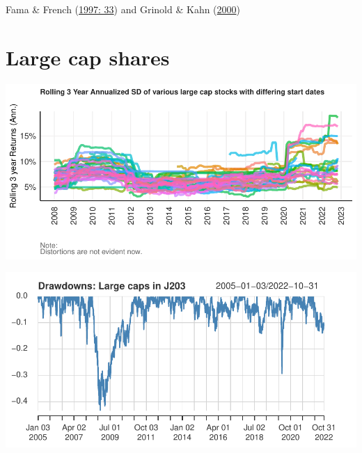\documentclass[11pt,preprint, authoryear]{elsarticle}
\let\origfigure\figure
\let\endorigfigure\endfigure
\renewenvironment{figure}[1][2] {
    \expandafter\origfigure\expandafter[H]
} {
    \endorigfigure
}
\numberwithin{equation}{section}
\numberwithin{figure}{section}
\numberwithin{table}{section}
\begin{document}
Fama \& French (\protect\hyperlink{ref-fama1997}{1997: 33}) and Grinold
\& Kahn (\protect\hyperlink{ref-grinold2000}{2000})

\hypertarget{large-cap-shares}{%
\section{\texorpdfstring{Large cap shares
\label{Large}}{Large cap shares }}\label{large-cap-shares}}

\begin{figure}[H]

{\centering \includegraphics{Volatility-of-Shares_files/figure-latex/Figure1-1} 

}

\caption{Large rolling SD \label{Figure1}}\label{fig:Figure1}
\end{figure}

\begin{figure}[H]

{\centering \includegraphics{Volatility-of-Shares_files/figure-latex/Figure2-1} 

}

\caption{Large cap drawdown chart \label{Figure2}}\label{fig:Figure2}
\end{figure}
\end{document}
